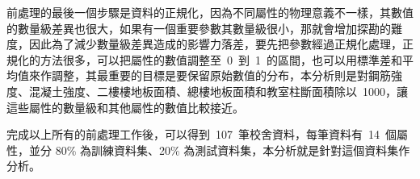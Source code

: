 
前處理的最後一個步驟是資料的正規化，因為不同屬性的物理意義不一樣，其數值的數量級差異也很大，如果有一個重要參數其數量級很小，那就會增加探勘的難度，因此為了減少數量級差異造成的影響力落差，要先把參數經過正規化處理，正規化的方法很多，可以把屬性的數值調整至~0~到~1~的區間，也可以用標準差和平均值來作調整，其最重要的目標是要保留原始數值的分布，本分析則是對鋼筋強度、混凝土強度、二樓樓地板面積、總樓地板面積和教室柱斷面積除以~1000，讓這些屬性的數量級和其他屬性的數值比較接近。


完成以上所有的前處理工作後，可以得到~107~筆校舍資料，每筆資料有~14~個屬性，並分 80\% 為訓練資料集、20\% 為測試資料集，本分析就是針對這個資料集作分析。


